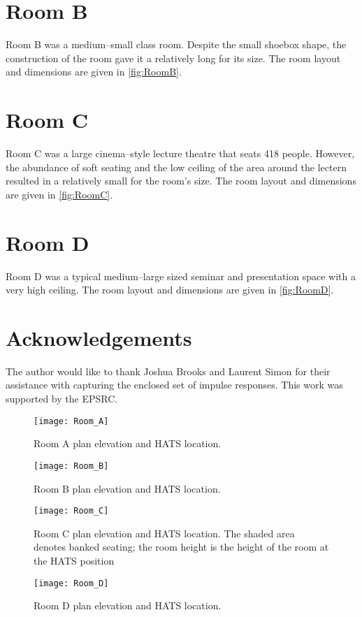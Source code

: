 \section{Room B}

Room B was a medium--small class room.  Despite the small shoebox shape, the construction of the room gave it a relatively long \RT{} for its size.  The room layout and dimensions are given in \autoref{fig:RoomB}.



\section{Room C}

Room C was a large cinema--style lecture theatre that seats 418 people.  However, the abundance of soft seating and the low ceiling of the area around the lectern resulted in a relatively small \RT{} for the room's size.  The room layout and dimensions are given in \autoref{fig:RoomC}.



\section{Room D}

Room D was a typical medium--large sized seminar and presentation space with a very high ceiling.  The room layout and dimensions are given in \autoref{fig:RoomD}.

\section*{Acknowledgements}

The author would like to thank Joshua Brooks and Laurent Simon for their assistance with capturing the enclosed set of impulse responses. This work was supported by the EPSRC.

\begin{figure}
\centering
\texttt{[image: Room\_A]}
\caption[Room A plan elevation]{Room A plan elevation and HATS location.}
\label{fig:RoomA}
\end{figure}

\begin{figure}
\centering
\texttt{[image: Room\_B]}
\caption[Room B plan elevation]{Room B plan elevation and HATS location.}
\label{fig:RoomB}
\end{figure}

\begin{figure}
\centering
\texttt{[image: Room\_C]}
\caption[Room C plan elevation]{Room C plan elevation and HATS location.  The shaded area denotes banked seating; the room height is the height of the room at the HATS position}
\label{fig:RoomC}
\end{figure}

\begin{figure}
\centering
\texttt{[image: Room\_D]}
\caption[Room D plan elevation]{Room D plan elevation and HATS location.}
\label{fig:RoomD}
\end{figure}